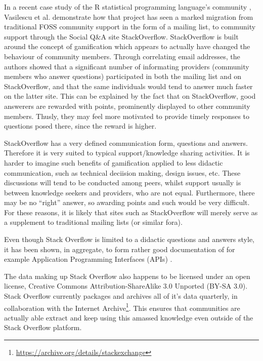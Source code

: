 \documentclass[a4paper,11pt]{article} %
\begin{document}
In a recent case study of the R statistical programming language's community
\cite{Vasilescu14StackOverflow}, Vasilescu et al. demonstrate how that
project has seen a marked migration from traditional FOSS community support
in the form of a mailing list, to community support through the Social
Q\&{}A site StackOverflow. StackOverflow is built around the concept of
gamification\cite{deterding2011game} which appears to actually have changed
the behaviour of community members. Through correlating email addresses, the
authors showed that a significant number of informating providers (community
members who answer questions) participated in both the mailing list and on
StackOverflow, and that the same individuals would tend to answer much
faster on the latter site. This can be explained by the fact that on
StackOverflow, good answerers are rewarded with points, prominently
displayed to other community members. Thusly, they may feel more motivated
to provide timely responses to questions posed there, since the reward is
higher.



StackOverflow has a very defined communication form, questions and
answers. Therefore it is very suited to typical support/knowledge sharing
activities. It is harder to imagine such benefits of gamification applied to
less didactic communication, such as technical deciision making, design
issues, etc. These discussions will tend to be conducted among peers, whilst
support usually is between knowledge seekers and providers, who are not
equal. Furthermore, there may be no ``right'' answer, so awarding points and
such would be very difficult. For these reasons, it is likely that sites
such as StackOverflow will merely serve as a supplement to traditional
mailing lists (or similar fora).

Even though Stack Overflow is limited to a didactic questions and answers
style, it has been shown, in aggregate, to form rather good documentation of
for example Application Programming Interfaces (APIs)
\cite{parnin2012crowd}.

The data making up Stack Overflow also happens to be licensed under an open
license, Creative Commons Attribution-ShareAlike 3.0 Unported (BY-SA
3.0). Stack Overflow currently packages and archives all of it's data
quarterly, in collaboration with the Internet
Archive\footnote{\url{https://archive.org/details/stackexchange}}. This
ensures that communities are actually able extract and keep using this
amassed knowledge even outside of the Stack Overflow platform.
\end{document}
